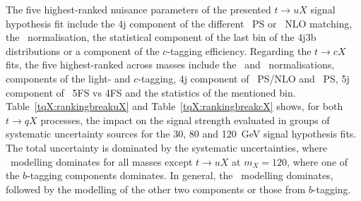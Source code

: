 The five highest-ranked nuisance parameters of the presented $t\to uX$ signal hypothesis fit include the 4j component of the different \ttjets\ PS or \ttl\ NLO matching, the \ttc\ normalisation, the statistical component of the last bin of the 4j3b distributions or a component of the $c$-tagging efficiency. Regarding the $t\to cX$ fits, the five highest-ranked across masses include the \ttb\ and \ttc\ normalisations, components of the light- and $c$-tagging, 4j component of \ttb\ PS/NLO and \ttl\ PS, 5j component of \ttb\ 5FS vs 4FS and the statistics of the mentioned bin.\\

Table~\ref{tqX:rankingbreakuX} and Table~\ref{tqX:rankingbreakcX} shows, for both $t\to qX$ processes, the impact on the signal strength evaluated in groups of systematic uncertainty sources for the 30, 80 and 120~GeV signal hypothesis fits. The total uncertainty is dominated by the systematic uncertainties, where \ttb\ modelling dominates for all masses except $t\to uX$ at $m_X=120$, where one of the $b$-tagging components dominates. In general, the \ttb\ modelling dominates, followed by the modelling of the other two components or those from $b$-tagging.\\

